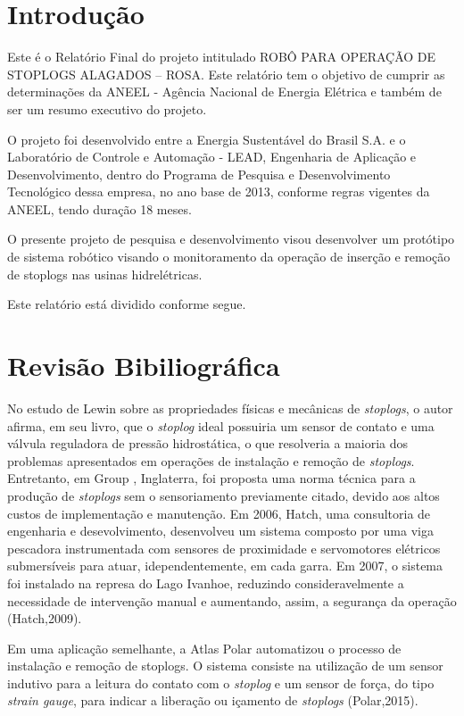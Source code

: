 \section{Introdução}
Este é o Relatório Final do projeto intitulado ROBÔ PARA OPERAÇÃO DE STOPLOGS
ALAGADOS – ROSA. Este relatório tem o objetivo de cumprir as determinações da
ANEEL - Agência Nacional de Energia Elétrica e também de ser um resumo
executivo do projeto.

O projeto foi desenvolvido entre a Energia Sustentável do Brasil S.A. e o
Laboratório de Controle e Automação - LEAD, Engenharia de Aplicação e
Desenvolvimento, dentro do Programa de Pesquisa e Desenvolvimento Tecnológico
dessa empresa, no ano base de 2013, conforme regras vigentes da ANEEL, tendo
duração 18 meses.

O presente projeto de pesquisa e desenvolvimento visou desenvolver um protótipo
de sistema robótico visando o monitoramento da operação de inserção e remoção
de stoplogs nas usinas hidrelétricas.

Este relatório está dividido conforme segue.

\section{Revisão Bibiliográfica}

No estudo de Lewin \cite{jack} sobre as propriedades físicas e mecânicas de 
\textit{stoplogs}, o autor afirma, em seu livro, que o
\textit{stoplog} ideal possuiria um sensor de contato e uma válvula reguladora
de pressão hidrostática, o que resolveria a maioria dos problemas apresentados
em operações de instalação e remoção de \textit{stoplogs}. Entretanto, em Group
\cite{pinc}, Inglaterra, foi proposta uma norma técnica para a produção de
\textit{stoplogs} sem o sensoriamento previamente citado, devido aos altos custos de implementação e manutenção. Em
2006, Hatch, uma consultoria de engenharia e desevolvimento,
desenvolveu um sistema composto por uma viga pescadora instrumentada com sensores de
proximidade e servomotores elétricos submersíveis para atuar, idependentemente,
em cada garra. Em 2007, o sistema foi instalado na represa do Lago Ivanhoe,
reduzindo consideravelmente a necessidade de intervenção manual e aumentando,
assim, a segurança da operação (Hatch,2009)\cite{hatch}.

Em uma aplicação semelhante, a Atlas Polar automatizou o processo
de instalação e remoção de stoplogs. O sistema consiste na utilização de um
sensor indutivo para a leitura do contato com o \textit{stoplog} e um sensor de força, do tipo
\textit{strain gauge}, para indicar a liberação ou içamento de
\textit{stoplogs} (Polar,2015)\cite{atlas}.


